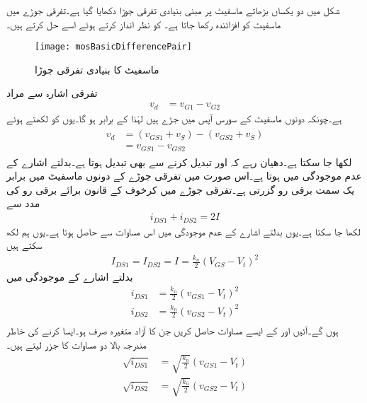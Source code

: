  
شکل  میں دو یکساں بڑھاتے ماسفیٹ پر مبنی بنیادی تفرقی جوڑا دکھایا گیا ہے۔تفرقی جوڑے میں ماسفیٹ کو افزائندہ رکھا جاتا ہے۔ کو نظر انداز کرتے ہوئے اسے حل کرتے ہیں۔
\begin{figure}
\centering
\texttt{[image: mosBasicDifferencePair]}
\caption{ماسفیٹ کا بنیادی تفرقی جوڑا}
\label{شکل_تفرقی_ماسفیٹ_بنیادی_تفرقی_جوڑا}
\end{figure}
تفرقی اشارہ  سے مراد
\begin{align*}
v_d&=v_{G1}-v_{G2}
\end{align*}
ہے۔چونکہ دونوں ماسفیٹ کے سورس  آپس میں جڑے ہیں لہٰذا  کے برابر ہو گا۔یوں  کو  لکھتے ہوئے
\begin{gather}
\begin{aligned}\label{مساوات_تفرقی_اشارے_کی_دوسری_شکل}
v_d&=\left(v_{GS1}+v_S \right)-\left(v_{GS2}+v_S \right)\\
&=v_{GS1}-v_{GS2}
\end{aligned}
\end{gather}
لکھا جا سکتا ہے۔دھیان رہے کہ  اور  تبدیل کرنے سے  بھی تبدیل ہوتا ہے۔بدلتے اشارے کے عدم موجودگی میں  ہوتا ہے۔اس صورت میں تفرقی جوڑے کے دونوں ماسفیٹ میں برابر یک سمت برقی رو گزرتی ہے۔تفرقی جوڑے میں کرخوف کے قانون برائے برقی رو کی مدد سے
\begin{align}\label{مساوات_تفرقی_دونوں_برقی_رو_کا_مجموعی_قطعی_ہے}
i_{DS1}+i_{DS2}=2I
\end{align}
لکھا جا سکتا ہے۔یوں بدلتے اشارے کے عدم موجودگی  میں اس مساوات سے  حاصل ہوتا ہے۔یوں ہم لکھ سکتے ہیں
\begin{align}\label{مساوات_تفرقی_یکسمتی_برابر_برقی_رو_کی_مساوات}
I_{DS1}=I_{DS2}=I=\frac{k_n}{2} \left(V_{GS}-V_t \right)^2
\end{align}
بدلتے اشارے کے موجودگی میں
\begin{align*}
i_{DS1}&=\frac{k_n}{2}\left(v_{GS1}-V_t \right)^2\\
i_{DS2}&=\frac{k_n}{2}\left(v_{GS2}-V_t \right)^2\\
\end{align*}
ہوں گے۔آئیں  اور  کے ایسے مساوات حاصل کریں جن کا آزاد متغیرہ صرف  ہو۔ایسا کرنے کی خاطر مندرجہ بالا دو مساوات کا  جزر    لیتے ہیں۔
 \begin{align*}
\sqrt{i_{DS1}}&=\sqrt{\frac{k_n}{2}}\left(v_{GS1}-V_t \right)\\
\sqrt{i_{DS2}}&=\sqrt{\frac{k_n}{2}}\left(v_{GS2}-V_t \right)\\
\end{align*}
